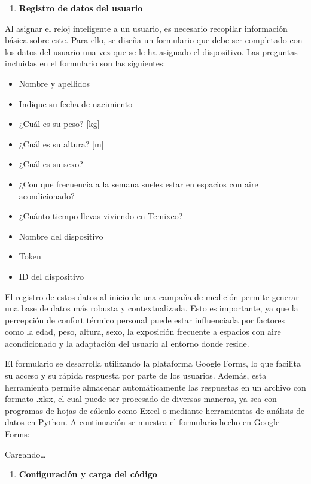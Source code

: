 \documentclass[
  12pt,
  letterpaper,
  DIV=11,
  numbers=noendperiod]{scrreport}
\providecommand{\tightlist}{%
  \setlength{\itemsep}{0pt}\setlength{\parskip}{0pt}}\usepackage{longtable,booktabs,array}
\begin{document}
\begin{enumerate}
\def\labelenumi{\arabic{enumi}.}
\setcounter{enumi}{1}
\tightlist
\item
  \textbf{Registro de datos del usuario}
\end{enumerate}

Al asignar el reloj inteligente a un usuario, es necesario recopilar
información básica sobre este. Para ello, se diseña un formulario que
debe ser completado con los datos del usuario una vez que se le ha
asignado el dispositivo. Las preguntas incluidas en el formulario son
las siguientes:

\begin{itemize}
\tightlist
\item
  Nombre y apellidos
\item
  Indique su fecha de nacimiento
\item
  ¿Cuál es su peso? {[}kg{]}
\item
  ¿Cuál es su altura? {[}m{]}
\item
  ¿Cuál es su sexo?
\item
  ¿Con que frecuencia a la semana sueles estar en espacios con aire
  acondicionado?
\item
  ¿Cuánto tiempo llevas viviendo en Temixco?
\item
  Nombre del dispositivo
\item
  Token
\item
  ID del dispositivo
\end{itemize}

El registro de estos datos al inicio de una campaña de medición permite
generar una base de datos más robusta y contextualizada. Esto es
importante, ya que la percepción de confort térmico personal puede estar
influenciada por factores como la edad, peso, altura, sexo, la
exposición frecuente a espacios con aire acondicionado y la adaptación
del usuario al entorno donde reside.

El formulario se desarrolla utilizando la plataforma Google Forms, lo
que facilita su acceso y su rápida respuesta por parte de los usuarios.
Además, esta herramienta permite almacenar automáticamente las
respuestas en un archivo con formato .xlsx, el cual puede ser procesado
de diversas maneras, ya sea con programas de hojas de cálculo como Excel
o mediante herramientas de análisis de datos en Python. A continuación
se muestra el formulario hecho en Google Forms:

Cargando\ldots{}

\begin{enumerate}
\def\labelenumi{\arabic{enumi}.}
\setcounter{enumi}{2}
\tightlist
\item
  \textbf{Configuración y carga del código}
\end{enumerate}
\end{document}

